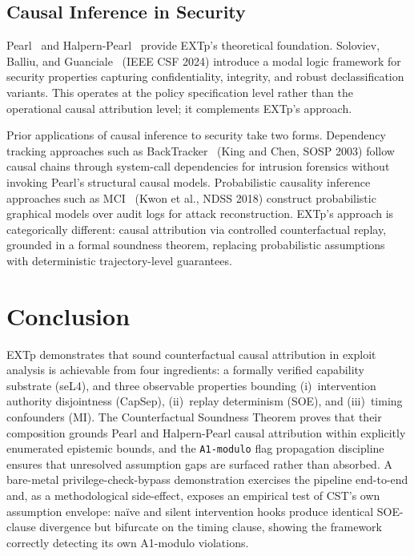 \documentclass[conference]{IEEEtran}
\begin{document}
\subsection{Causal Inference in Security}

Pearl~\cite{pearl2009causality} and
Halpern-Pearl~\cite{halpern2005causes} provide EXTp's theoretical
foundation. Soloviev, Balliu, and
Guanciale~\cite{soloviev2024modal} (IEEE CSF 2024) introduce a
modal logic framework for security properties capturing
confidentiality, integrity, and robust declassification variants.
This operates at the policy specification level rather than the
operational causal attribution level; it complements EXTp's
approach.

Prior applications of causal inference to security take two forms.
Dependency tracking approaches such as
BackTracker~\cite{king2003backtracking} (King and Chen, SOSP 2003)
follow causal chains through system-call dependencies for intrusion
forensics without invoking Pearl's structural causal models.
Probabilistic causality inference approaches such as
MCI~\cite{kwon2018mci} (Kwon et al., NDSS 2018) construct
probabilistic graphical models over audit logs for attack
reconstruction. EXTp's approach is categorically different: causal
attribution via controlled counterfactual replay, grounded in a
formal soundness theorem, replacing probabilistic assumptions with
deterministic trajectory-level guarantees.

\section{Conclusion}\label{sec:conclusion}

EXTp demonstrates that sound counterfactual causal attribution in
exploit analysis is achievable from four ingredients: a formally
verified capability substrate (seL4), and three observable
properties bounding (i)~intervention authority disjointness
(CapSep), (ii)~replay determinism (SOE), and (iii)~timing
confounders (MI). The Counterfactual Soundness Theorem proves that
their composition grounds Pearl and Halpern-Pearl causal
attribution within explicitly enumerated epistemic bounds, and the
\texttt{A1-modulo} flag propagation discipline ensures that
unresolved assumption gaps are surfaced rather than absorbed. A
bare-metal privilege-check-bypass demonstration exercises the
pipeline end-to-end and, as a methodological side-effect, exposes
an empirical test of CST's own assumption envelope: naïve and
silent intervention hooks produce identical SOE-clause divergence
but bifurcate on the timing clause, showing the framework
correctly detecting its own A1-modulo violations.
\end{document}

